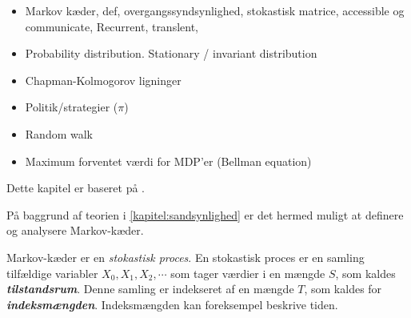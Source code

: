 \begin{itemize}
    \item Markov kæder, def, overgangssyndsynlighed, stokastisk matrice, accessible og communicate, Recurrent, translent, 
    \item Probability distribution. Stationary / invariant distribution
    \item Chapman-Kolmogorov ligninger
    \item Politik/strategier ($\pi$)
    \item Random walk
    \item Maximum forventet værdi for MDP’er (Bellman equation)
\end{itemize}

Dette kapitel er baseret på \cite[s.]{olofsson2005probability}.

På baggrund af teorien i \autoref{kapitel:sandsynlighed} er det hermed muligt at definere og analysere Markov-kæder. 

Markov-kæder er en \textit{stokastisk proces}. En stokastisk proces er en samling tilfældige variabler $X_0, X_1, X_2, \cdots$ som tager værdier i en mængde $S$, som kaldes \textbf{\textit{tilstandsrum}}. Denne samling er indekseret af en  mængde $T$, som kaldes for \textbf{\textit{indeksmængden}}. Indeksmængden kan foreksempel beskrive tiden. 

